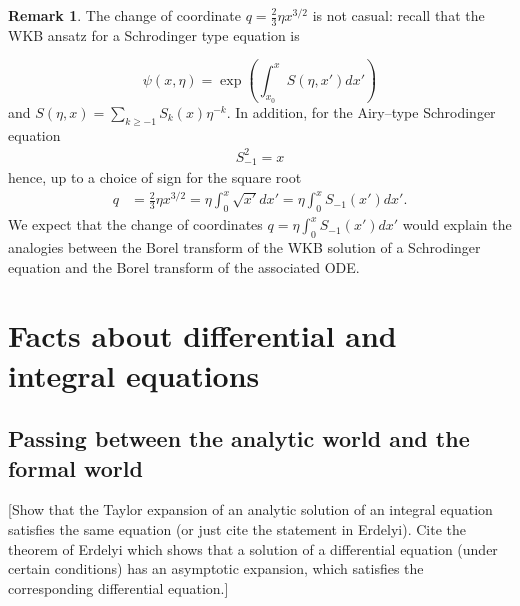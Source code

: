 \documentclass{article}
\theoremstyle{definition}
\newtheorem{remark}[definition]{Remark}
\theoremstyle{plain}
\newenvironment{todo}{\color{Coral}}{\color{black}}
\begin{document}
\begin{remark}
The change of coordinate $q=\frac{2}{3}\eta x^{3/2}$ is not casual: recall that the WKB ansatz for a Schrodinger type equation is

\begin{equation}
\psi(x,\eta)=\exp\left(\int_{x_0}^xS(\eta,x')dx'\right)
\end{equation} 
 and $S(\eta,x)=\sum_{k\geq -1}S_k(x)\eta^{-k}$. In addition, for the Airy--type Schrodinger equation 
 \begin{align*}
 S_{-1}^2=x
 \end{align*}
hence, up to a choice of sign for the square root
\begin{align*}
q&=\frac{2}{3}\eta x^{3/2}=\eta\int_0^x\sqrt{x'}dx'=\eta\int_{0}^xS_{-1}(x')dx'.
\end{align*}
We expect that the change of coordinates $q=\eta\int_0^{x}S_{-1}(x')dx'$ would explain the analogies between the Borel transform of the WKB solution of a Schrodinger equation and the Borel transform of the associated ODE.  
\end{remark} 

\section{Facts about differential and integral equations}\label{apx:generalities_ODEs}
\begin{todo}
\subsection{Passing between the analytic world and the formal world}
[Show that the Taylor expansion of an analytic solution of an integral equation satisfies the same equation (or just cite the statement in Erdelyi). Cite the theorem of Erdelyi which shows that a solution of a differential equation (under certain conditions) has an asymptotic expansion, which satisfies the corresponding differential equation.]
\end{todo}
\end{document}
